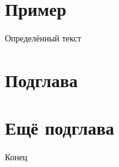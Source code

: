 \documentclass[twoside]{article}
\begin{document}
\section{Пример}

Определённый текст

\section{Подглава}


\section{Ещё подглава}


Конец
\end{document}
